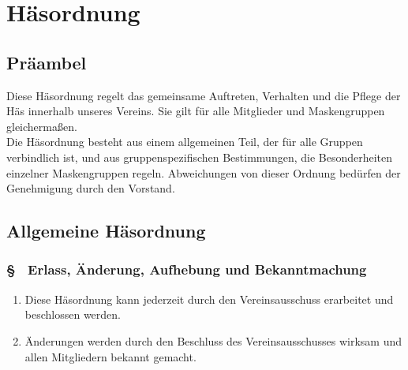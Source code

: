 \setcounter{hoparagraphcounter}{1}

\section{Häsordnung}

\subsection{Präambel}
Diese Häsordnung regelt das gemeinsame Auftreten, Verhalten und die Pflege der Häs innerhalb unseres Vereins. Sie gilt für alle Mitglieder und Maskengruppen gleichermaßen. \\
Die Häsordnung besteht aus einem allgemeinen Teil, der für alle Gruppen verbindlich ist, und aus gruppenspezifischen Bestimmungen, die Besonderheiten einzelner Maskengruppen regeln. Abweichungen von dieser Ordnung bedürfen der Genehmigung durch den Vorstand.

\subsection{Allgemeine Häsordnung}
\subsubsection{§ \thehoparagraphcounter\ Erlass, Änderung, Aufhebung und Bekanntmachung} \label{ho:par:erlass_aenderung_aufhebung}
\begin{enumerate}
    \item \label{ho:abs:oo93id} Diese Häsordnung kann jederzeit durch den Vereinsausschuss erarbeitet und beschlossen werden.

    \item \label{ho:abs:q4q0qq} Änderungen werden durch den Beschluss des Vereinsausschusses wirksam und allen Mitgliedern bekannt gemacht.
\end{enumerate}

